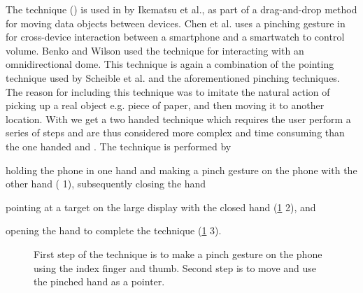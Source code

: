 The \pinch technique () is used in \cite{Ikematsu:2015} by Ikematsu et al., as part of a drag-and-drop method for moving data objects between devices.
Chen et al. uses a pinching gesture in \cite{Chen:2014} for cross-device interaction between a smartphone and a smartwatch to control volume. 
Benko and Wilson \cite{Benko:2010} used the \pinch technique for interacting with an omnidirectional dome.
This technique is again a combination of the pointing technique used by Scheible et al. \cite{Scheible:2008} and the aforementioned pinching techniques. 
The reason for including this technique was to imitate the natural action of picking up a real object e.g. piece of paper, and then moving it to another location.
With \pinch we get a two handed technique which requires the user perform a series of steps and are thus considered more complex and time consuming  than the one handed \swipe and \tilt.
The \pinch technique is performed by 
\begin{enumerate*}[label=\itshape\roman*\upshape)]
	\item{holding the phone in one hand and making a pinch gesture on the phone with the other hand ( 1), subsequently closing the hand}
	\item{pointing at a target on the large display with the closed hand (\cref{fig:pinchTechnique} 2), and}
	\item{opening the hand to complete the technique (\cref{fig:pinchTechnique} 3).}
\end{enumerate*}

\begin{figure}[H]
\caption{
	\protect{} First step of the \pinch technique is to make a pinch gesture on the phone using the index finger and thumb. Second step is to move and use the pinched hand as a pointer.
}
\label{fig:pinchTechnique}
\end{figure}


